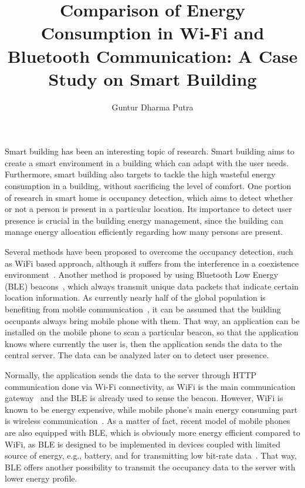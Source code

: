 \documentclass[journal]{vgtc}                %
\title{Comparison of Energy Consumption in Wi-Fi and Bluetooth Communication: A Case Study on Smart Building}
\author{Guntur Dharma Putra}
\begin{document}


\maketitle
Smart building has been an interesting topic of research. Smart building aims to create a smart environment in a building which can adapt with the user needs. Furthermore, smart building also targets to tackle the high wasteful energy consumption in a building, without sacrificing the level of comfort. One portion of research in smart home is occupancy detection, which aims to detect whether or not a person is present in a particular location. Its importance to detect user presence is crucial in the building energy management, since the building can manage energy allocation efficiently regarding how many persons are present.

Several methods have been proposed to overcome the occupancy detection, such as WiFi based approach, although it suffers from the interference in a coexistence environment~\cite{Pei2012}. Another method is proposed by using Bluetooth Low Energy (BLE) beacons~\cite{Conte2014}, which always transmit unique data packets that indicate certain location information. As currently nearly half of the global population is benefiting from mobile communication~\cite{Fowdur2016}, it can be assumed that the building occupants always bring mobile phone with them. That way, an application can be installed on the mobile phone to scan a particular beacon, so that the application knows where currently the user is, then the application sends the data to the central server. The data can be analyzed later on to detect user presence.

Normally, the application sends the data to the server through HTTP communication done via Wi-Fi connectivity, as WiFi is the main communication gateway~\cite{Fowdur2016} and the BLE is already used to sense the beacon. However, WiFi is known to be energy expensive, while mobile phone's main energy consuming part is wireless communication~\cite{Fowdur2016,Crk2009}. As a matter of fact, recent model of mobile phones are also equipped with BLE, which is obviously more energy efficient compared to WiFi, as BLE is designed to be implemented in devices coupled with limited source of energy, e.g., battery, and for transmitting low bit-rate data~\cite{Friedman2013}. That way, BLE offers another possibility to transmit the occupancy data to the server with lower energy profile.
\end{document}
